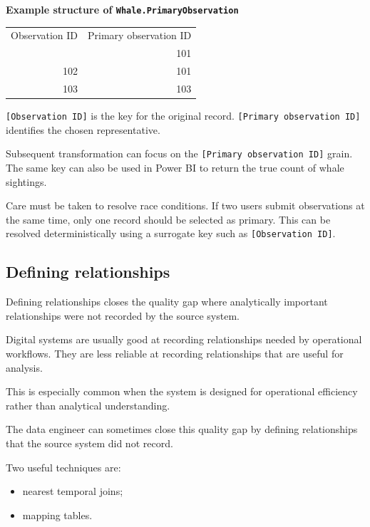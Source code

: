 \documentclass[10pt,openany,10pt]{book}
\providecommand{\tightlist}{%
  \setlength{\itemsep}{0pt}\setlength{\parskip}{0pt}}
\newcounter{none}
\let\podeToprule\toprule
\let\podeMidrule\midrule
\let\podeBottomrule\bottomrule
\renewcommand{\toprule}{\arrayrulecolor{pbiGrid}\podeToprule}
\renewcommand{\midrule}{\arrayrulecolor{pbiGrid}\podeMidrule}
\renewcommand{\bottomrule}{\arrayrulecolor{pbiGrid}\podeBottomrule}
\begin{document}
\textbf{Example structure of \texttt{Whale.PrimaryObservation}}

{\def\LTcaptype{none} %
\begin{longtable}[]{@{}rr@{}}
\toprule\noalign{}
Observation ID & Primary observation ID \\
\midrule\noalign{}
\endhead
\bottomrule\noalign{}
\endlastfoot
101 & 101 \\
102 & 101 \\
103 & 103 \\
\end{longtable}
}

\texttt{{[}Observation\ ID{]}} is the key for the original record.
\texttt{{[}Primary\ observation\ ID{]}} identifies the chosen
representative.

Subsequent transformation can focus on the
\texttt{{[}Primary\ observation\ ID{]}} grain. The same key can also be
used in Power BI to return the true count of whale sightings.

Care must be taken to resolve race conditions. If two users submit
observations at the same time, only one record should be selected as
primary. This can be resolved deterministically using a surrogate key
such as \texttt{{[}Observation\ ID{]}}.

\subsection{Defining relationships}\label{defining-relationships}

Defining relationships closes the quality gap where analytically
important relationships were not recorded by the source system.

Digital systems are usually good at recording relationships needed by
operational workflows. They are less reliable at recording relationships
that are useful for analysis.

This is especially common when the system is designed for operational
efficiency rather than analytical understanding.

The data engineer can sometimes close this quality gap by defining
relationships that the source system did not record.

Two useful techniques are:

\begin{itemize}
\tightlist
\item
  nearest temporal joins;
\item
  mapping tables.
\end{itemize}
\end{document}
